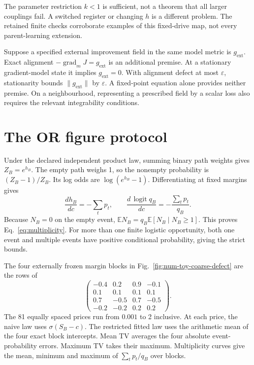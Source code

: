 The parameter restriction \(k<1\) is sufficient, not a theorem that all larger couplings fail. A switched register or changing \(h\) is a different problem. The retained finite checks corroborate examples of this fixed-drive map, not every parent-learning extension.

Suppose a specified external improvement field in the same model metric is \(g_{\mathrm{ext}}\). Exact alignment
\(-\operatorname{grad}_m J=g_{\mathrm{ext}}\) is an additional premise. At a stationary gradient-model state it implies \(g_{\mathrm{ext}}=0\). With alignment defect at most \(\varepsilon\), stationarity bounds \(\|g_{\mathrm{ext}}\|\) by \(\varepsilon\). A fixed-point equation alone provides neither premise. On a neighbourhood, representing a prescribed field by a scalar loss also requires the relevant integrability conditions.

\section{The OR figure protocol}
\label{app:or-protocol}

Under the declared independent product law, summing binary path weights gives \(Z_B=e^{h_B}\). The empty path weighs 1, so the nonempty probability is \((Z_B-1)/Z_B\). Its log odds are \(\log(e^{h_B}-1)\). Differentiating at fixed margins gives
\[
 \frac{dh_B}{dc}=-\sum_tp_t,\qquad
 \frac{d\,\operatorname{logit}q_B}{dc}
                  =-\frac{\sum_tp_t}{q_B}.
\]
Because \(N_B=0\) on the empty event,
\(\mathbb E N_B=q_B\mathbb E[N_B\mid N_B\geq1]\).
This proves Eq.~\eqref{eq:multiplicity}. For more than one finite logistic opportunity, both one event and multiple events have positive conditional probability, giving the strict bounds.

The four externally frozen margin blocks in Fig.~\ref{fig:num-toy-coarse-defect} are the rows of
\[
 \begin{pmatrix}
 -0.4&0.2&0.9&-0.1\\
 0.1&0.1&0.1&0.1\\
 0.7&-0.5&0.7&-0.5\\
 -0.2&-0.2&0.2&0.2
 \end{pmatrix}.
\]
The 81 equally spaced prices run from \(0.001\) to 2 inclusive. At each price, the naive law uses \(\sigma(S_B-c)\). The restricted fitted law uses the arithmetic mean of the four exact block intercepts. Mean TV averages the four absolute event-probability errors. Maximum TV takes their maximum. Multiplicity curves give the mean, minimum and maximum of \(\sum_tp_t/q_B\) over blocks.

